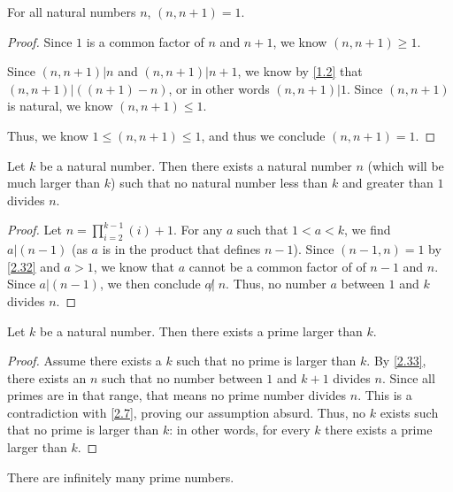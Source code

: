 \documentclass[../main.tex]{subfiles}
\begin{document}
\begin{thm} \label{2.32}
  For all natural numbers $n$, $(n, n+1) = 1$.
\end{thm}

\begin{proof}
  Since $1$ is a common factor of $n$ and $n+1$, we know $(n, n+1) \geq 1$.

  Since $(n,n+1) | n$ and $(n, n+1) | n+1$, we know by \ref{1.2} that $(n,n+1) | ((n+1) - n)$, or in other words $(n, n+1) | 1$. Since $(n, n+1)$ is natural, we know $(n, n+1) \leq 1$.

  Thus, we know $1 \leq (n, n+1) \leq 1$, and thus we conclude $(n, n+1) = 1$.
\end{proof}



\begin{thm} \label{2.33}
  Let $k$ be a natural number. Then there exists a natural number $n$ (which will be much larger than $k$) such that no natural number less than $k$ and greater than $1$ divides $n$.
\end{thm}

\begin{proof}
  Let $n = \prod_{i=2}^{k-1} (i) + 1$. For any $a$ such that $1 < a < k$, we find $a | (n-1)$ (as $a$ is in the product that defines $n-1$). Since $(n-1, n) = 1$ by \ref{2.32} and $a > 1$, we know that $a$ cannot be a common factor of  of $n-1$ and $n$.
  Since $a | (n-1)$, we then conclude $a \not | \; n$. Thus, no number $a$ between $1$ and $k$ divides $n$.
\end{proof}



\begin{thm} \label{2.34}
  Let $k$ be a natural number. Then there exists a prime larger than $k$.
\end{thm}

\begin{proof}
  Assume there exists a $k$ such that no prime is larger than $k$. By \ref{2.33}, there exists an $n$ such that no number between $1$ and $k+1$ divides $n$. Since all primes are in that range, that means no prime number divides $n$. This is a contradiction with \ref{2.7}, proving our assumption absurd. Thus, no $k$ exists such that no prime is larger than $k$: in other words, for every $k$ there exists a prime larger than $k$.
\end{proof}



\begin{thm} \label{2.35}
  There are infinitely many prime numbers.
\end{thm}
\end{document}
